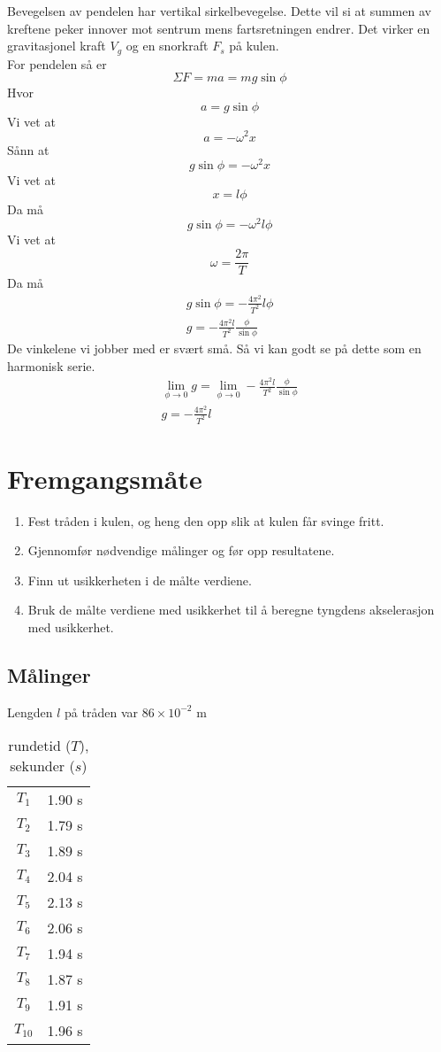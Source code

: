 \documentclass[a4paper]{article}
\begin{document}
Bevegelsen av pendelen har vertikal sirkelbevegelse. Dette vil si at summen av kreftene peker innover mot sentrum mens fartsretningen endrer. Det virker en gravitasjonel kraft $V_g$ og en snorkraft $F_s$ på kulen.  \\
For pendelen så er 
\[
\Sigma F = ma = mg\sin{\phi} 
\] 
Hvor 
\[
a = g\sin{\phi}
\] 
Vi vet at 
\[
a = -\omega^2x
\] 
Sånn at
\[
	g\sin{\phi} = -\omega^2x
\] 
Vi vet at
\[
x = l\phi 
\] 
Da må 
\[
	g\sin{\phi} = -\omega^2l\phi 
\] 
Vi vet at
\[
\omega = \frac{2\pi}{T} 
\] 
Da må
\[
\begin{gathered}
	g\sin{\phi } = -\frac{4\pi^2}{T^2} l\phi \\
	g = -\frac{4\pi^2l}{T^2} \frac{\phi}{\sin{\phi}} 
\end{gathered}
\] 
De vinkelene vi jobber med er svært små. Så vi kan godt se på dette som en harmonisk serie. 
\[
\begin{gathered}
	\lim_{\phi \to 0} g = \lim_{\phi \to 0} -\frac{4\pi^2l}{T^2} \frac{\phi}{\sin{\phi}}  \\
	g = -\frac{4\pi^2}{T^2} l
\end{gathered}
\] 



\section{Fremgangsmåte} %
\label{sec:fremgangsmåte}
\begin{enumerate}
	\item Fest tråden i kulen, og heng den opp slik at kulen får svinge fritt.
	\item Gjennomfør nødvendige målinger og før opp resultatene.
	\item Finn ut usikkerheten i de målte verdiene.
	\item Bruk de målte verdiene med usikkerhet til å beregne tyngdens akselerasjon med usikkerhet.
\end{enumerate}
\subsection{Målinger} %
\label{sub:målinger}
Lengden $l$ på tråden var $86\times 10^{-2}$ m
\begin{table}[htpb]
	\centering
	\caption{rundetid ($ T $), sekunder ($ s $)}
	\label{tab:label}
	\begin{tabular}{c c}
		$T_1$ & 1.90 s \\
		$T_2$ & 1.79 s \\
		$T_3$ & 1.89 s \\
		$T_4$ & 2.04 s \\
		$T_5$ & 2.13 s \\
		$T_6$ & 2.06 s \\
		$T_7$ & 1.94 s \\
		$T_8$ & 1.87 s \\
		$T_9$ & 1.91 s \\
		$T_{10}$ & 1.96 s \\
	\end{tabular}
\end{table}
\newpage
\end{document}
